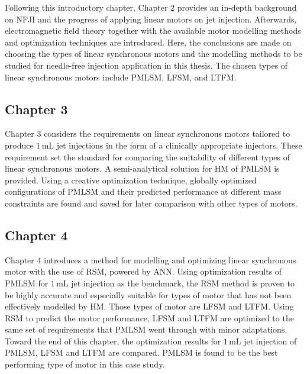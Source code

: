     Following this introductory chapter, Chapter 2 provides an in-depth background on \acs{NFJI} and the progress of applying linear motors on jet injection. Afterwards, electromagnetic field theory together with the available motor modelling methods and optimization techniques are introduced. Here, the conclusions are made on choosing the types of linear synchronous motors and the modelling methods to be studied for needle-free injection application in this thesis. The chosen types of linear synchronous motors include \acf{PMLSM}, \acf{LFSM}, and \acf{LTFM}.
    
    \subsection{Chapter 3}  \label{Chapter:intro/outline/chapter3}
    
    
    Chapter 3 considers the requirements on linear synchronous motors tailored to produce $1\,\mathrm{mL}$ jet injections in the form of a clinically appropriate injectors. These requirement set the standard for comparing the suitability of different types of linear synchronous motors. A semi-analytical solution for \acf{HM} of \acf{PMLSM} is provided. Using a creative optimization technique, globally optimized configurations of \acf{PMLSM} and their predicted performance at different mass constraints are found and saved for later comparison with other types of motors. 
    
    
    \subsection{Chapter 4}  \label{Chapter:intro/outline/chapter4}
    
    
    Chapter 4 introduces a method for modelling and optimizing linear synchronous motor with the use of \acf{RSM}, powered by \acf{ANN}. Using optimization results of \acs{PMLSM} for $1\,\mathrm{mL}$ jet injection as the benchmark, the \acf{RSM} method is proven to be highly accurate and especially suitable for types of motor that has not been effectively modelled by \acs{HM}. Those types of motor are \acs{LFSM} and \acs{LTFM}. Using \acf{RSM} to predict the motor performance, \acs{LFSM} and \acs{LTFM} are optimized to the same set of requirements that \acs{PMLSM} went through with minor adaptations. Toward the end of this chapter, the optimization results for $1\,\mathrm{mL}$ jet injection of \acs{PMLSM}, \acs{LFSM} and \acs{LTFM} are compared. \acs{PMLSM} is found to be the best performing type of motor in this case study.
    

